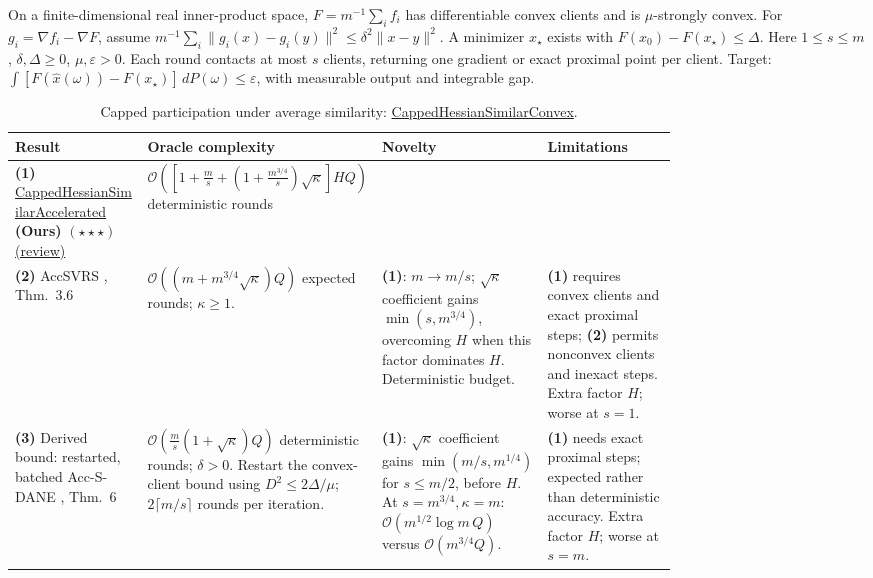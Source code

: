 \begin{table}[tp]
\centering
\caption{Capped participation under average similarity: \href{https://github.com/k3nfalt/longtails/blob/main/LongTails/Setups/CappedHessianSimilarConvex.lean}{CappedHessianSimilarConvex}.}\label{tab:CappedHessianSimilarConvex}
\parbox{\linewidth}{\footnotesize On a finite-dimensional real inner-product space, $F=m^{-1}\sum_i f_i$ has differentiable convex clients and is $\mu$-strongly convex. For $g_i=\nabla f_i-\nabla F$, assume $m^{-1}\sum_i\|g_i(x)-g_i(y)\|^2\leq\delta^2\|x-y\|^2$. A minimizer $x_\star$ exists with $F(x_0)-F(x_\star)\leq\Delta$. Here $1\leq s\leq m$, $\delta,\Delta\geq0$, $\mu,\varepsilon>0$. Each round contacts at most $s$ clients, returning one gradient or exact proximal point per client. Target: $\int [F(\widehat x(\omega))-F(x_\star)]\,dP(\omega)\leq\varepsilon$, with measurable output and integrable gap.}\par\smallskip
\begin{threeparttable}
\footnotesize
\setlength{\tabcolsep}{4pt}\renewcommand{\arraystretch}{1.25}
\begin{tabularx}{\linewidth}{@{}>{\raggedright\arraybackslash}p{0.20\linewidth}>{\raggedright\arraybackslash}p{0.32\linewidth}>{\raggedright\arraybackslash}p{0.25\linewidth}>{\raggedright\arraybackslash}X@{}}
\toprule
\textbf{Result} & \textbf{Oracle complexity} & \textbf{Novelty} & \textbf{Limitations} \\
\midrule
\textbf{(1)} \href{https://github.com/k3nfalt/longtails/blob/main/LongTails/Theorems/CappedHessianSimilarAccelerated.lean}{Capped\allowbreak Hessian\allowbreak Similar\allowbreak Accelerated} \textbf{(Ours)} $(\star\star\star)$ \href{https://github.com/k3nfalt/longtails/blob/main/scripts/reviews/CappedHessianSimilarAccelerated.md}{(review)} & $\mathcal{O}\!\left(\left[1+\frac ms+\left(1+\frac{m^{3/4}}s\right)\sqrt\kappa\right]HQ\right)$ deterministic rounds & & \\
\midrule[1.2pt]
\textbf{(2)} AccSVRS \citep{chsLin2023v2}, Thm.~3.6 & $\mathcal{O}((m+m^{3/4}\sqrt\kappa)Q)$ expected rounds; $\kappa\geq1$. & \textbf{(1)}: $m\to m/s$; $\sqrt\kappa$ coefficient gains $\min(s,m^{3/4})$, overcoming $H$ when this factor dominates $H$. Deterministic budget. & \textbf{(1)} requires convex clients and exact proximal steps; \textbf{(2)} permits nonconvex clients and inexact steps. Extra factor $H$; worse at $s=1$. \\
\midrule
\textbf{(3)} Derived bound: restarted, batched Acc-S-DANE \citep{chsJiang2024v2}, Thm.~6 & $\mathcal{O}(\frac ms(1+\sqrt\kappa)Q)$ deterministic rounds; $\delta>0$. Restart the convex-client bound using $D^2\leq2\Delta/\mu$; $2\lceil m/s\rceil$ rounds per iteration. & \textbf{(1)}: $\sqrt\kappa$ coefficient gains $\min(m/s,m^{1/4})$ for $s\leq m/2$, before $H$. At $s=m^{3/4},\kappa=m$: $\mathcal{O}(m^{1/2}\log m\,Q)$ versus $\mathcal{O}(m^{3/4}Q)$. & \textbf{(1)} needs exact proximal steps; expected rather than deterministic accuracy. Extra factor $H$; worse at $s=m$. \\

\end{tabularx}
\end{threeparttable}
\end{table}
